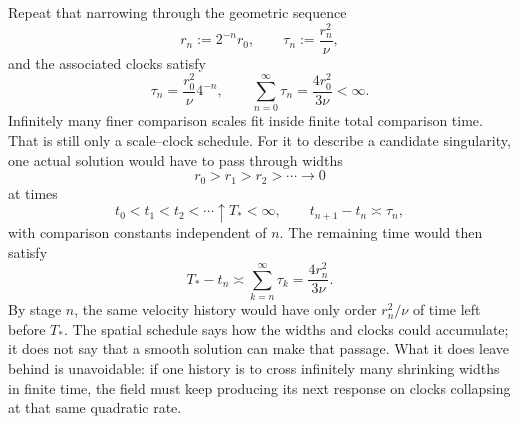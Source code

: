 Repeat that narrowing through the geometric sequence
\[
  r_n:=2^{-n}r_0,
  \qquad
  \tau_n:=\frac{r_n^2}{\nu},
\]
and the associated clocks satisfy
\[
  \tau_n
  =
  \frac{r_0^2}{\nu}4^{-n},
  \qquad
  \sum_{n=0}^{\infty}\tau_n
  =
  \frac{4r_0^2}{3\nu}
  <
  \infty.
\]
Infinitely many finer comparison scales fit inside finite total comparison time. That is still only a scale--clock schedule. For it to describe a candidate singularity, one actual solution would have to pass through widths
\[
  r_0>r_1>r_2>\cdots\longrightarrow0
\]
at times
\[
  t_0<t_1<t_2<\cdots\uparrow T_*<\infty,
  \qquad
  t_{n+1}-t_n\asymp\tau_n,
\]
with comparison constants independent of \(n\). The remaining time would then satisfy
\[
  T_*-t_n
  \asymp
  \sum_{k=n}^{\infty}\tau_k
  =
  \frac{4r_n^2}{3\nu}.
\]
By stage \(n\), the same velocity history would have only order \(r_n^2/\nu\) of time left before \(T_*\). The spatial schedule says how the widths and clocks could accumulate; it does not say that a smooth solution can make that passage. What it does leave behind is unavoidable: if one history is to cross infinitely many shrinking widths in finite time, the field must keep producing its next response on clocks collapsing at that same quadratic rate.
